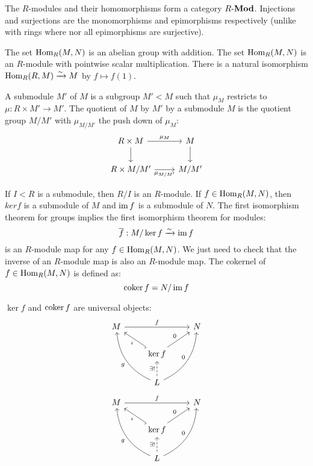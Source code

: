 \begin{rmk}
	The $R$-modules and their homomorphisms form a category $R\mbox{-}\mathbf{Mod}$.
	Injections and surjections are the monomorphisms and epimorphisms respectively (unlike with rings where nor all epimorphisms are surjective).
\end{rmk}

\begin{prop}[1.3]
	\begin{enum}
		\io The set $\operatorname{Hom}_R(M,N)$ is an abelian group with addition.
		\io The set $\operatorname{Hom}_R(M,N)$ is an $R$-module with pointwise scalar multiplication.
		\io There is a natural isomorphism $\operatorname{Hom}_R(R,M) \xrightarrow{\sim} M$ by $f \mapsto f(1)$.
	\end{enum}
\end{prop}

\begin{defn}[1.4]
	\begin{enum}
		\io A submodule $M'$ of $M$ is a subgroup $M'<M$ such that $\mu_M$ restricts to $\mu: R \times M' \to M'$.
		\io The quotient of $M$ by $M'$ by a submodule $M$ is the quotient group $M/M'$ with $\mu_{M/M'}$ the push down of $\mu_M$:
		\[
			\begin{tikzcd}
				R \times M \arrow[r, "\mu_M"] \arrow[d] & M \arrow[d] \\
				R \times M/M' \arrow[r, "\mu_{M/M'}"'] & M/M'
			\end{tikzcd}
		\]
	\end{enum}
\end{defn}

\begin{exam}
	\begin{enum}
		\io If $I<R$ is a submodule, then $R/I$ is an $R$-module.
		\io If $f \in \operatorname{Hom}_R(M,N)$, then $ker f$ is a submodule of $M$ and $\operatorname{im} f$ is a submodule of $N$.
		\io The first isomorphism theorem for groups implies the first isomorphism theorem for modules:
		\[\overline{f}: M/\ker f \xrightarrow{\sim} \operatorname{im} f\]
		is an $R$-module map for any $f \in \operatorname{Hom}_R(M,N)$.
		We just need to check that the inverse of an $R$-module map is also an $R$-module map.
		\io The cokernel of $f \in \operatorname{Hom}_R(M,N)$ is defined as:
		\[\operatorname{coker} f = N/\operatorname{im} f\]
	\end{enum}
\end{exam}

\begin{rmk}
	$\ker f$ and $\operatorname{coker} f$ are universal objects:
	\[
		\begin{tikzcd}
			M \arrow[rr, "f"] & & N \\
			& \ker f \arrow[ul, hook, "\iota"] \arrow[ur, "0"] & \\
			& L \arrow[uul, bend left, "g"] \arrow[uur, bend right, "0"] \arrow[u, dashed, "\exists !"] &
		\end{tikzcd}
	\]
	\[
		\begin{tikzcd}
			M \arrow[rr, "f"] & & N \\
			& \ker f \arrow[ul, hook, "\iota"] \arrow[ur, "0"] & \\
			& L \arrow[uul, bend left, "g"] \arrow[uur, bend right, "0"] \arrow[u, dashed, "\exists !"] &
		\end{tikzcd}
	\]
\end{rmk}